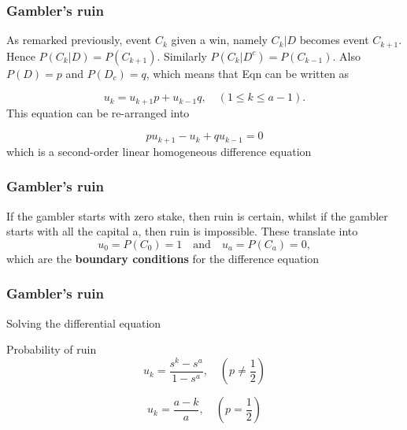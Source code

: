 \documentclass[spanish]{beamer}
\begin{document}
\begin{frame}
\frametitle{Gambler’s ruin}
As remarked previously, event $C_{k}$ given a win, namely $C_{k} \vert D$ becomes event $C_{k+1}$. Hence $P(C_{k} \vert D) = P(C_{k+1} )$. Similarly $P(C_{k} \vert D^{c} ) = P(C_{k-1} )$. Also $P(D) = p$ and $P(D_{c}) = q$, which means that Eqn can be written as

\begin{equation*}
u_{k} = u_{k+1} p + u_{k-1} q, \quad (1 \leq k \leq a -1).
\end{equation*}
This equation can be re-arranged into

\begin{equation*}
 p u_{k+1} -u_{k}+ qu_{k-1} = 0
\end{equation*}
which is a second-order linear homogeneous difference equation

\end{frame}

\begin{frame}
\frametitle{Gambler’s ruin}
If the gambler starts with zero stake, then ruin is certain, whilst if the gambler starts with all the capital a, then ruin is impossible. These translate into
\begin{equation*}
u_{0} = P(C_{0}) = 1 \quad \text{and} \quad u_{a} = P(C_{a}) = 0,
\end{equation*}
which are the \textbf{boundary conditions} for the difference equation
\end{frame}
\begin{frame}
\frametitle{Gambler’s ruin}
Solving the differential equation
\begin{block}{Probability of ruin}
\begin{equation*}
u_{k}=\frac{s^k-s^a}{1-s^a}, \quad (p\neq \frac{1}{2} )
\end{equation*}

\begin{equation*}
u_{k}=\frac{a-k}{a}, \quad (p= \frac{1}{2} )
\end{equation*}
\end{block}


\end{frame}
\end{document}
